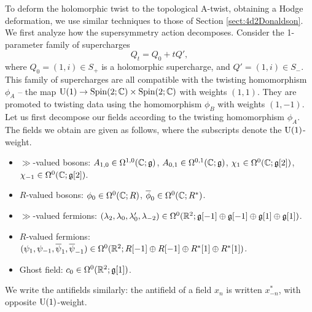 \documentclass[10pt, oneside]{article}
\renewcommand{\U}{\mathrm{U}}
\begin{document}
To deform the holomorphic twist to the topological A-twist, obtaining a Hodge deformation, we use similar techniques to those of Section \ref{sect:4d2Donaldson}.  We first analyze how the supersymmetry action decomposes.  Consider the 1-parameter family of supercharges
\begin{equation} \label{eq:2dHodgefamily}
Q_t = Q_0 + tQ',
\end{equation}
where $Q_0 = (1,i) \in S_+$ is a holomorphic supercharge, and $Q' = (1,i) \in S_-$.  This family of supercharges are all compatible with the twisting homomorphism $\phi_A$ -- the map $\U(1) \to \spin(2;\CC) \times \spin(2;\CC)$ with weights $(1,1)$.  They are promoted to twisting data using the homomorphism $\phi_B$ with weights $(1,-1)$.  Let us first decompose our fields according to the twisting homomorphism $\phi_A$.  The fields we obtain are given as follows, where the subscripts denote the $\mathrm{U}(1)$-weight.
\begin{itemize}
 \item $\gg$-valued bosons: $A_{1,0} \in \Omega^{1,0}(\mathbb C; \mathfrak g)$, $A_{0,1} \in \Omega^{0,1} (\mathbb C ; \mathfrak g)$, $\chi_1 \in \Omega^0(\mathbb C ; \mathfrak g[2])$, $\chi_{-1} \in \Omega^0(\mathbb C ; \mathfrak g[2])$. 
 \item  $R$-valued bosons: $\phi_0 \in \Omega^0(\mathbb C ; R)$,  $\overline{\phi}_0 \in \Omega^0(\mathbb C ; R^*)$.
 \item $\gg$-valued fermions: $(\lambda_2, \lambda_0, \lambda'_{0}, \lambda_{-2}) \in \Omega^0(\mathbb R^2 ; \mathfrak{g}[-1] \oplus \mathfrak{g}[-1] \oplus \mathfrak{g}[1] \oplus \mathfrak{g}[1])$.
 \item $R$-valued fermions: $(\psi_1, \psi_{-1}, \overline{\psi}_1, \overline{\psi}_{-1}) \in \Omega^0(\mathbb R^2 ; R[-1] \oplus R[-1] \oplus R^*[1] \oplus R^*[1])$.
 \item Ghost field: $c_0 \in \Omega^0(\mathbb R^2; \mathfrak{g}[1])$.
\end{itemize}
We write the antifields similarly: the antifield of a field $x_n$ is written $x^*_{-n}$, with opposite $\mathrm{U}(1)$-weight.
\end{document}
